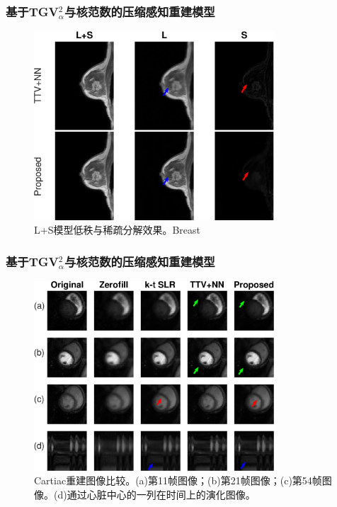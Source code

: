 \documentclass{beamer}
\begin{document}
\begin{frame}
	\frametitle{基于TGV$_\alpha^2$与核范数的压缩感知重建模型}
	\begin{figure}[htbp]
	\centering
		\includegraphics[width=0.8\textwidth]{../img/tgvnn/breast1_55_l+s.eps}
	\caption{L+S模型低秩与稀疏分解效果。Breast}
\end{figure}
\end{frame}

\begin{frame}
	\frametitle{基于TGV$_\alpha^2$与核范数的压缩感知重建模型}
	\begin{figure}[htbp]
	\centering
		\includegraphics[width=0.8\textwidth]{../img/tgvnn/perfusion_frames.eps}
	\caption{Cartiac重建图像比较。(a)第11帧图像；(b)第21帧图像；(c)第54帧图像。(d)通过心脏中心的一列在时间上的演化图像。}
\end{figure}
\end{frame}

\end{document}

